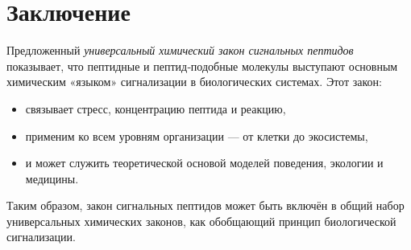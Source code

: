 \documentclass[12pt]{article}
\begin{document}
\section{Заключение}

Предложенный \emph{универсальный химический закон сигнальных пептидов} показывает, что пептидные и пептид‑подобные молекулы выступают основным химическим «языком» сигнализации в биологических системах. Этот закон:

\begin{itemize}
  \item связывает стресс, концентрацию пептида и реакцию,
  \item применим ко всем уровням организации — от клетки до экосистемы,
  \item и может служить теоретической основой моделей поведения, экологии и медицины.
\end{itemize}

Таким образом, закон сигнальных пептидов может быть включён в общий набор универсальных химических законов, как обобщающий принцип биологической сигнализации.
\end{document}
